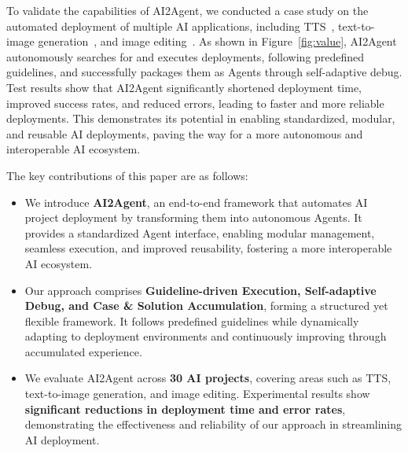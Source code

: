 To validate the capabilities of AI2Agent, we conducted a case study on the automated deployment of multiple AI applications, including TTS~\cite{sparktts}, text-to-image generation~\cite{dall-e}, and image editing~\cite{instructpix2pix}. As shown in Figure~\ref{fig:value}, AI2Agent autonomously searches for and executes deployments, following predefined guidelines, and successfully packages them as Agents through self-adaptive debug. Test results show that AI2Agent significantly shortened deployment time, improved success rates, and reduced errors, leading to faster and more reliable deployments. This demonstrates its potential in enabling standardized, modular, and reusable AI deployments, paving the way for a more autonomous and interoperable AI ecosystem.

The key contributions of this paper are as follows:
\begin{itemize}
    \item We introduce \textbf{AI2Agent}, an end-to-end framework that automates AI project deployment by transforming them into autonomous Agents. It provides a standardized Agent interface, enabling modular management, seamless execution, and improved reusability, fostering a more interoperable AI ecosystem.
    \item Our approach comprises \textbf{Guideline-driven Execution, Self-adaptive Debug, and Case \& Solution Accumulation}, forming a structured yet flexible framework. It follows predefined guidelines while dynamically adapting to deployment environments and continuously improving through accumulated experience.
    \item We evaluate AI2Agent across \textbf{30 AI projects}, covering areas such as TTS, text-to-image generation, and image editing. Experimental results show \textbf{significant reductions in deployment time and error rates}, demonstrating the effectiveness and reliability of our approach in streamlining AI deployment.
\end{itemize}